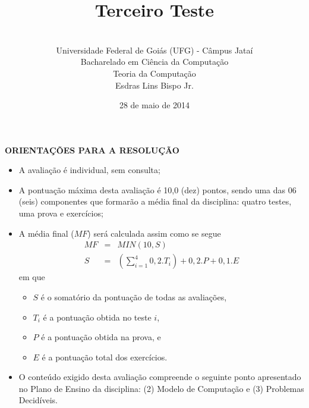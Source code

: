 \documentclass[12pt,a4paper,oneside]{article}
\author{\\Universidade Federal de Goiás (UFG) - Câmpus Jataí\\Bacharelado em Ciência da Computação \\Teoria da Computação \\Esdras Lins Bispo Jr.}
\date{28 de maio de 2014}
\title{\sc \huge Terceiro Teste}
\begin{document}
\maketitle

{\bf ORIENTAÇÕES PARA A RESOLUÇÃO}

\begin{itemize}
	\item A avaliação é individual, sem consulta;
	\item A pontuação máxima desta avaliação é 10,0 (dez) pontos, sendo uma das 06 (seis) componentes que formarão a média final da disciplina: quatro testes, uma prova e exercícios;
	\item A média final ($MF$) será calculada assim como se segue
	\begin{eqnarray}
		MF & = & MIN(10, S) \nonumber \\
		S & = & (\sum_{i=1}^{4} 0,2.T_i ) + 0,2.P  + 0,1.E \nonumber
	\end{eqnarray}
	em que 
	\begin{itemize}
		\item $S$ é o somatório da pontuação de todas as avaliações,
		\item $T_i$ é a pontuação obtida no teste $i$,
		\item $P$ é a pontuação obtida na prova, e
		\item $E$ é a pontuação total dos exercícios.
	\end{itemize}
	\item O conteúdo exigido desta avaliação compreende o seguinte ponto apresentado no Plano de Ensino da disciplina: (2) Modelo de Computação e (3) Problemas Decidíveis.
\end{itemize}

\begin{center}
\end{center}

\newpage
\end{document}

